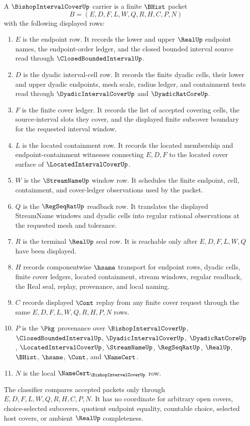 \begin{definition}
\label{def:bishop-interval-cover-carrier}
A $\BishopIntervalCoverUp$ carrier is a finite $\BHist$ packet
$$
B=(E,D,F,L,W,Q,R,H,C,P,N)
$$
with the following displayed rows:
\begin{enumerate}
\item $E$ is the endpoint row. It records the lower and upper $\RealUp$ endpoint names, the endpoint-order ledger, and the closed bounded interval source read through $\ClosedBoundedIntervalUp$.
\item $D$ is the dyadic interval-cell row. It records the finite dyadic cells, their lower and upper dyadic endpoints, mesh scale, radius ledger, and containment tests read through $\DyadicIntervalCoverUp$ and $\DyadicRatCoreUp$.
\item $F$ is the finite cover ledger. It records the list of accepted covering cells, the source-interval slots they cover, and the displayed finite subcover boundary for the requested interval window.
\item $L$ is the located containment row. It records the located membership and endpoint-containment witnesses connecting $E,D,F$ to the located cover surface of $\LocatedIntervalCoverUp$.
\item $W$ is the $\StreamNameUp$ window row. It schedules the finite endpoint, cell, containment, and cover-ledger observations used by the packet.
\item $Q$ is the $\RegSeqRatUp$ readback row. It translates the displayed StreamName windows and dyadic cells into regular rational observations at the requested mesh and tolerance.
\item $R$ is the terminal $\RealUp$ seal row. It is reachable only after $E,D,F,L,W,Q$ have been displayed.
\item $H$ records componentwise $\hsame$ transport for endpoint rows, dyadic cells, finite cover ledgers, located containment, stream windows, regular readback, the Real seal, replay, provenance, and local naming.
\item $C$ records displayed $\Cont$ replay from any finite cover request through the same $E,D,F,L,W,Q,R,H,P,N$ rows.
\item $P$ is the $\Pkg$ provenance over $\BishopIntervalCoverUp$, $\ClosedBoundedIntervalUp$, $\DyadicIntervalCoverUp$, $\DyadicRatCoreUp$, $\LocatedIntervalCoverUp$, $\StreamNameUp$, $\RegSeqRatUp$, $\RealUp$, $\BHist$, $\hsame$, $\Cont$, and $\NameCert$.
\item $N$ is the local $\NameCert_{\BishopIntervalCoverUp}$ row.
\end{enumerate}
The classifier compares accepted packets only through $E,D,F,L,W,Q,R,H,C,P,N$. It has no coordinate for arbitrary open covers, choice-selected subcovers, quotient endpoint equality, countable choice, selected host covers, or ambient $\RealUp$ completeness.
\end{definition}

